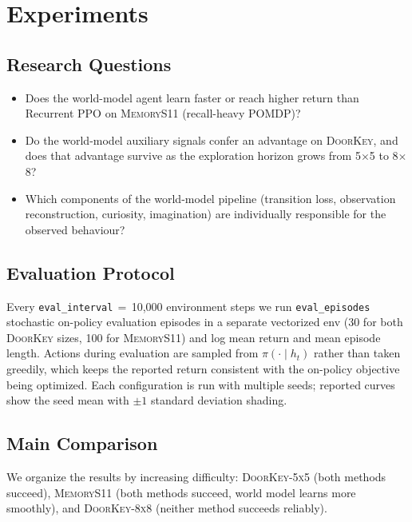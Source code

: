 \documentclass[letterpaper]{article}
\begin{document}
\section{Experiments}
\label{sec:experiments}

\subsection{Research Questions}

\begin{itemize}
    \item[\textbf{RQ1}] Does the world-model agent learn faster or reach
    higher return than Recurrent PPO on \textsc{MemoryS11} (recall-heavy
    POMDP)?
    \item[\textbf{RQ2}] Do the world-model auxiliary signals confer an
    advantage on \textsc{DoorKey}, and does that advantage survive as the
    exploration horizon grows from 5$\times$5 to 8$\times$8?
    \item[\textbf{RQ3}] Which components of the world-model pipeline
    (transition loss, observation reconstruction, curiosity, imagination)
    are individually responsible for the observed behaviour?
\end{itemize}

\subsection{Evaluation Protocol}

Every \texttt{eval\_interval}$\,=\,$10{,}000 environment steps we run
\texttt{eval\_episodes} stochastic on-policy evaluation episodes in a
separate vectorized env (30 for both \textsc{DoorKey} sizes, 100 for
\textsc{MemoryS11}) and log mean return and mean episode length. Actions
during evaluation are sampled from $\pi(\cdot\mid h_t)$ rather than taken
greedily, which keeps the reported return consistent with the on-policy
objective being optimized. Each configuration is run with multiple seeds;
reported curves show the seed mean with $\pm 1$ standard deviation shading.

\subsection{Main Comparison}

We organize the results by increasing difficulty: \textsc{DoorKey-5x5}
(both methods succeed), \textsc{MemoryS11} (both methods succeed,
world model learns more smoothly), and \textsc{DoorKey-8x8}
(neither method succeeds reliably).
\end{document}
